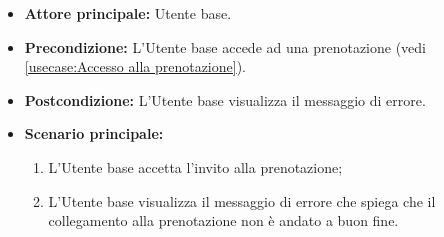 \label{usecase:Visualizzazione errore prenotazione fallita}
\begin{itemize}
	\item \textbf{Attore principale:} Utente base.

	\item \textbf{Precondizione:}
	      L'Utente base accede ad una prenotazione (vedi \autoref{usecase:Accesso alla prenotazione}).

	\item \textbf{Postcondizione:}
	      L'Utente base visualizza il messaggio di errore.

	\item \textbf{Scenario principale:}
	      \begin{enumerate}
		      \item L'Utente base accetta l'invito alla prenotazione;
		      \item L'Utente base visualizza il messaggio di errore che spiega che il collegamento alla prenotazione non è andato a buon fine.
	      \end{enumerate}
\end{itemize}